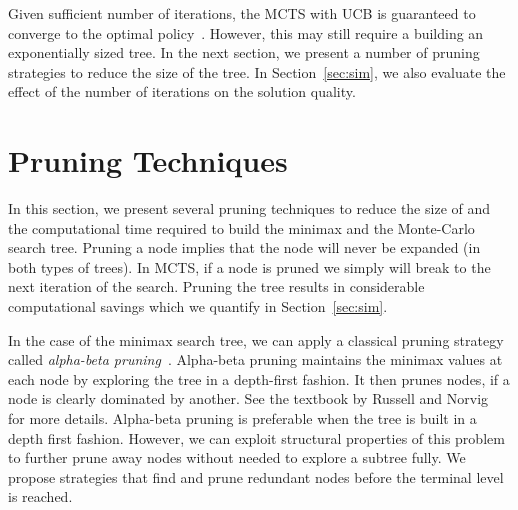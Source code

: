 \documentclass[10 pt, conference]{ieeeconf}
\newcommand{\PT}[1]{{\footnotesize\color{blue}[{\bf PT:} \textsf{#1}]}} %
\begin{document}
Given sufficient number of iterations, the MCTS with UCB is guaranteed to converge to the optimal policy~\cite{baier2013monte}. However, this may still require a building an exponentially sized tree. In the next section, we present a number of pruning strategies to reduce the size of the tree. In Section~\ref{sec:sim}, we also evaluate the effect of the number of iterations on the solution quality.



\section{Pruning Techniques} \label{sec:pruning}

In this section, we present several pruning techniques to reduce the size of and the computational time required to build the minimax and the Monte-Carlo search tree. Pruning a node implies that the node will never be expanded (in both types of trees). %
In MCTS, if a node is pruned we simply will break to the next iteration of the search. Pruning the tree results in considerable computational savings which we quantify in Section~\ref{sec:sim}.

In the case of the minimax search tree, we can apply a classical pruning strategy called \emph{alpha-beta pruning}~\cite{russell2009artificial}.
Alpha-beta pruning maintains the minimax values at each node by exploring the tree in a depth-first fashion. It then prunes nodes, if a node is clearly dominated by another. See the textbook by Russell and Norvig~\cite{russell2009artificial} for more details. Alpha-beta pruning is preferable when the tree is built in a depth first fashion. However, we can exploit structural properties of this problem to further prune away nodes without needed to explore a subtree fully. We propose  strategies that find and prune redundant nodes before the terminal level is reached. 
\end{document}
